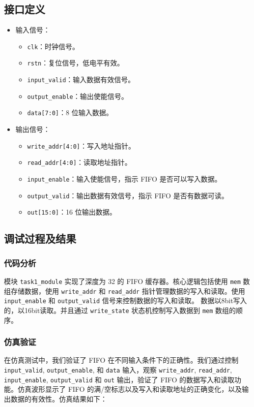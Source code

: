 \documentclass[zihao=5, UTF8]{article}
\theoremstyle{MyLineTheoremStyle} %
\theoremstyle{MyBlockTheoremStyle} %
\theoremstyle{MySubsubsectionStyle} %
\begin{document}
\subsection{接口定义}
\begin{itemize}
    \item 输入信号：
    \begin{itemize}
        \item \texttt{clk}：时钟信号。
        \item \texttt{rstn}：复位信号，低电平有效。
        \item \texttt{input\_valid}：输入数据有效信号。
        \item \texttt{output\_enable}：输出使能信号。
        \item \texttt{data[7:0]}：8 位输入数据。
    \end{itemize}
    \item 输出信号：
    \begin{itemize}
        \item \texttt{write\_addr[4:0]}：写入地址指针。
        \item \texttt{read\_addr[4:0]}：读取地址指针。
        \item \texttt{input\_enable}：输入使能信号，指示 FIFO 是否可以写入数据。
        \item \texttt{output\_valid}：输出数据有效信号，指示 FIFO 是否有数据可读。
        \item \texttt{out[15:0]}：16 位输出数据。
    \end{itemize}
\end{itemize}

\subsection{调试过程及结果}
\subsubsection{代码分析}
模块 \texttt{task1\_module} 实现了深度为 32 的 FIFO 缓存器。核心逻辑包括使用 \texttt{mem} 数组存储数据，使用 \texttt{write\_addr} 和 \texttt{read\_addr} 指针管理数据的写入和读取。使用 \texttt{input\_enable} 和 \texttt{output\_valid} 信号来控制数据的写入和读取。 数据以8bit写入的，以16bit读取。并且通过 \texttt{write\_state} 状态机控制写入数据到 \texttt{mem} 数组的顺序。
\subsubsection{仿真验证}
在仿真测试中，我们验证了 FIFO 在不同输入条件下的正确性。我们通过控制 \texttt{input\_valid}, \texttt{output\_enable}, 和 \texttt{data} 输入，观察 \texttt{write\_addr}, \texttt{read\_addr}, \texttt{input\_enable}, \texttt{output\_valid} 和 \texttt{out} 输出，验证了 FIFO 的数据写入和读取功能。仿真波形显示了 FIFO 的满/空标志以及写入和读取地址的正确变化，以及输出数据的有效性。仿真结果如下：
\end{document}
